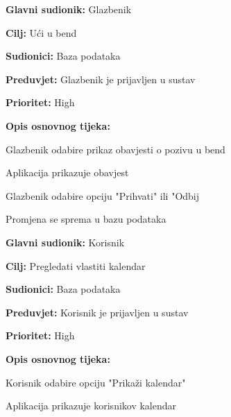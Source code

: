 \noindent {}
	\begin{packed_item}
		
		\item \textbf{Glavni sudionik:} Glazbenik
		\item \textbf{Cilj: } Ući u bend
		\item \textbf{Sudionici:} Baza podataka
		\item \textbf{Preduvjet:} Glazbenik je prijavljen u sustav
		\item \textbf{Prioritet:} High
		\item \textbf{Opis osnovnog tijeka:} 
		
		\item[] \begin{packed_enum}
			
			\item Glazbenik odabire prikaz obavjesti o pozivu u bend
			\item Aplikacija prikazuje obavjest
			\item Glazbenik odabire opciju "Prihvati" ili "Odbij
			\item Promjena se sprema u bazu podataka
		\end{packed_enum}
		
	\end{packed_item}
		
\noindent {}
	\begin{packed_item}
		
		\item \textbf{Glavni sudionik: } Korisnik
		\item \textbf{Cilj:} Pregledati vlastiti kalendar
		\item \textbf{Sudionici:} Baza podataka
		\item \textbf{Preduvjet:} Korisnik je prijavljen u sustav
		\item \textbf{Prioritet:} High
		\item \textbf{Opis osnovnog tijeka:} 
		
		\item[] \begin{packed_enum}
			
			\item Korisnik odabire opciju "Prikaži kalendar"
			\item Aplikacija prikazuje korisnikov kalendar
		\end{packed_enum}  
	\end{packed_item}
	
